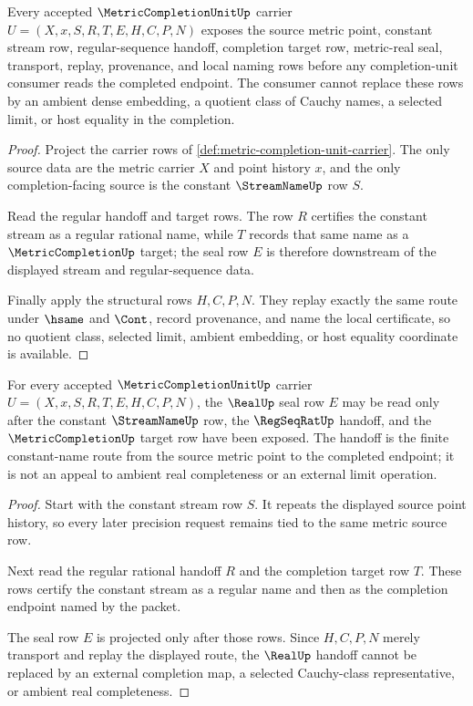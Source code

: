\begin{theorem}
\label{thm:metric-completion-unit-namecert-obligations}
Every accepted $\MetricCompletionUnitUp$ carrier $U=(X,x,S,R,T,E,H,C,P,N)$ exposes the source metric point, constant stream row, regular-sequence handoff, completion target row, metric-real seal, transport, replay, provenance, and local naming rows before any completion-unit consumer reads the completed endpoint. The consumer cannot replace these rows by an ambient dense embedding, a quotient class of Cauchy names, a selected limit, or host equality in the completion.
\end{theorem}
\begin{proof}
Project the carrier rows of \autoref{def:metric-completion-unit-carrier}. The only source data are the metric carrier $X$ and point history $x$, and the only completion-facing source is the constant $\StreamNameUp$ row $S$.

Read the regular handoff and target rows. The row $R$ certifies the constant stream as a regular rational name, while $T$ records that same name as a $\MetricCompletionUp$ target; the seal row $E$ is therefore downstream of the displayed stream and regular-sequence data.

Finally apply the structural rows $H,C,P,N$. They replay exactly the same route under $\hsame$ and $\Cont$, record provenance, and name the local certificate, so no quotient class, selected limit, ambient embedding, or host equality coordinate is available.
\end{proof}

\begin{theorem}
\label{thm:metric-completion-unit-real-handoff}
For every accepted $\MetricCompletionUnitUp$ carrier $U=(X,x,S,R,T,E,H,C,P,N)$, the $\RealUp$ seal row $E$ may be read only after the constant $\StreamNameUp$ row, the $\RegSeqRatUp$ handoff, and the $\MetricCompletionUp$ target row have been exposed. The handoff is the finite constant-name route from the source metric point to the completed endpoint; it is not an appeal to ambient real completeness or an external limit operation.
\end{theorem}
\begin{proof}
Start with the constant stream row $S$. It repeats the displayed source point history, so every later precision request remains tied to the same metric source row.

Next read the regular rational handoff $R$ and the completion target row $T$. These rows certify the constant stream as a regular name and then as the completion endpoint named by the packet.

The seal row $E$ is projected only after those rows. Since $H,C,P,N$ merely transport and replay the displayed route, the $\RealUp$ handoff cannot be replaced by an external completion map, a selected Cauchy-class representative, or ambient real completeness.
\end{proof}

